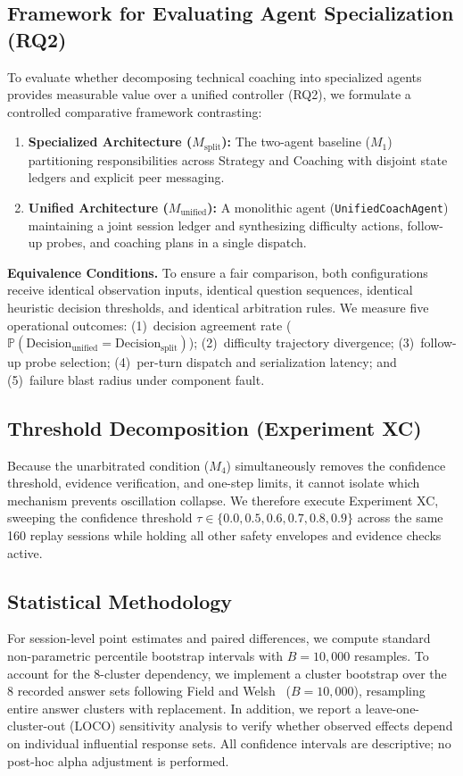 \subsection{Framework for Evaluating Agent Specialization (RQ2)}
To evaluate whether decomposing technical coaching into specialized agents provides measurable value over a unified controller (RQ2), we formulate a controlled comparative framework contrasting:
\begin{enumerate}
\item \textbf{Specialized Architecture ($M_{\text{split}}$):} The two-agent baseline ($M_1$) partitioning responsibilities across Strategy and Coaching with disjoint state ledgers and explicit peer messaging.
\item \textbf{Unified Architecture ($M_{\text{unified}}$):} A monolithic agent (\texttt{UnifiedCoachAgent}) maintaining a joint session ledger and synthesizing difficulty actions, follow-up probes, and coaching plans in a single dispatch.
\end{enumerate}

\noindent\textbf{Equivalence Conditions.} To ensure a fair comparison, both configurations receive identical observation inputs, identical question sequences, identical heuristic decision thresholds, and identical arbitration rules. We measure five operational outcomes: (1)~decision agreement rate ($\mathbb{P}(\text{Decision}_{\text{unified}} = \text{Decision}_{\text{split}})$); (2)~difficulty trajectory divergence; (3)~follow-up probe selection; (4)~per-turn dispatch and serialization latency; and (5)~failure blast radius under component fault.

\subsection{Threshold Decomposition (Experiment XC)}
Because the unarbitrated condition ($M_4$) simultaneously removes the confidence threshold, evidence verification, and one-step limits, it cannot isolate which mechanism prevents oscillation collapse. We therefore execute Experiment XC, sweeping the confidence threshold $\tau \in \{0.0, 0.5, 0.6, 0.7, 0.8, 0.9\}$ across the same 160 replay sessions while holding all other safety envelopes and evidence checks active.

\subsection{Statistical Methodology}
For session-level point estimates and paired differences, we compute standard non-parametric percentile bootstrap intervals with $B = 10{,}000$ resamples. To account for the 8-cluster dependency, we implement a cluster bootstrap over the 8 recorded answer sets following Field and Welsh~\cite{fw07} ($B = 10{,}000$), resampling entire answer clusters with replacement. In addition, we report a leave-one-cluster-out (LOCO) sensitivity analysis to verify whether observed effects depend on individual influential response sets. All confidence intervals are descriptive; no post-hoc alpha adjustment is performed.
